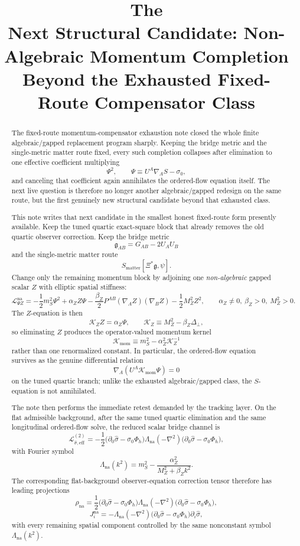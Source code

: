 \documentclass[11pt]{article}
\title{\textbf{The \TheoryName{}}\\[0.4em]
\large Next Structural Candidate: Non-Algebraic Momentum Completion Beyond the Exhausted Fixed-Route Compensator Class}
\author{}
\date{}
\newcommand{\BridgeMetric}{\mathfrak{g}}
\newcommand{\KZ}{\mathcal K_Z}
\newcommand{\Kmom}{\mathcal K_{\mathrm{mom}}}
\begin{document}
\maketitle

\begin{abstract}
The fixed-route momentum-compensator exhaustion note closed the whole finite algebraic/gapped replacement program sharply. Keeping the bridge metric and the single-metric matter route fixed, every such completion collapses after elimination to one effective coefficient multiplying
\[
\Psi^2,
\qquad
\Psi\equiv U^A\nabla_A S-\sigma_0,
\]
and canceling that coefficient again annihilates the ordered-flow equation itself. The next live question is therefore no longer another algebraic/gapped redesign on the same route, but the first genuinely new structural candidate beyond that exhausted class.

This note writes that next candidate in the smallest honest fixed-route form presently available. Keep the tuned quartic exact-square block that already removes the old quartic observer correction. Keep the bridge metric
\[
\BridgeMetric_{AB}=G_{AB}-2U_AU_B
\]
and the single-metric matter route
\[
S_{\mathrm{matter}}[\Xi^\ast\BridgeMetric,\psi].
\]
Change only the remaining momentum block by adjoining one \emph{non-algebraic} gapped scalar \(Z\) with elliptic spatial stiffness:
\[
\mathcal L_{\Psi Z}^{\mathrm{na}}
=
-\frac12 m_S^2\Psi^2
+\alpha_Z Z\Psi
-\frac{\beta_Z}{2}P^{AB}(\nabla_A Z)(\nabla_B Z)
-\frac12 M_Z^2Z^2,
\qquad
\alpha_Z\neq 0,\ \beta_Z>0,\ M_Z^2>0.
\]
The \(Z\)-equation is then
\[
\KZ Z
=
\alpha_Z\Psi,
\qquad
\KZ\equiv M_Z^2-\beta_Z\Delta_\perp,
\]
so eliminating \(Z\) produces the operator-valued momentum kernel
\[
\Kmom
\equiv
m_S^2-\alpha_Z^2\KZ^{-1}
\]
rather than one renormalized constant. In particular, the ordered-flow equation survives as the genuine differential relation
\[
\nabla_A\!\left(U^A\Kmom\Psi\right)=0
\]
on the tuned quartic branch; unlike the exhausted algebraic/gapped class, the \(S\)-equation is not annihilated.

The note then performs the immediate retest demanded by the tracking layer. On the flat admissible background, after the same tuned quartic elimination and the same longitudinal ordered-flow solve, the reduced scalar bridge channel is
\[
\mathcal L_{\hat\sigma,\mathrm{eff}}^{(2)}
=
-\frac12
\bigl(\partial_0\hat\sigma-\sigma_0\Phi_h\bigr)
\Lambda_{\mathrm{na}}(-\nabla^2)
\bigl(\partial_0\hat\sigma-\sigma_0\Phi_h\bigr),
\]
with Fourier symbol
\[
\Lambda_{\mathrm{na}}(k^2)
=
m_S^2-\frac{\alpha_Z^2}{M_Z^2+\beta_Zk^2}.
\]
The corresponding flat-background observer-equation correction tensor therefore has leading projections
\[
\rho_{\mathrm{na}}
=
\frac12
\bigl(\partial_0\hat\sigma-\sigma_0\Phi_h\bigr)
\Lambda_{\mathrm{na}}(-\nabla^2)
\bigl(\partial_0\hat\sigma-\sigma_0\Phi_h\bigr),
\]
\[
J_i^{\mathrm{na}}
=
-\Lambda_{\mathrm{na}}(-\nabla^2)
\bigl(\partial_0\hat\sigma-\sigma_0\Phi_h\bigr)\partial_i\hat\sigma,
\]
with every remaining spatial component controlled by the same nonconstant symbol \(\Lambda_{\mathrm{na}}(k^2)\).


\end{abstract}
\end{document}
